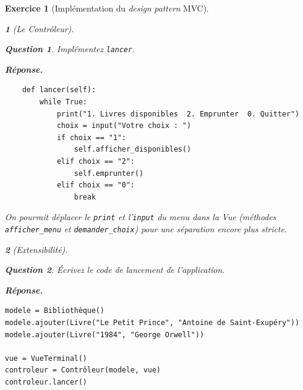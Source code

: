 \documentclass{article}
\theoremstyle{exostyle}
\newtheorem{exo}{Exercice}
\theoremstyle{partiestyle}
\newtheorem{partie}{}[exo]
\theoremstyle{questionstyle}
\newtheorem{questionpartie}{Question}[partie]
\newenvironment{reponse}{%
    \par\smallskip\noindent\textbf{Réponse.}\enspace\ignorespaces
}{%
    \par\smallskip
}
\begin{document}
\begin{exo}[Implémentation du \textit{design pattern} MVC]
\begin{partie}[Le Contrôleur]
        \begin{questionpartie}
            Implémentez \texttt{lancer}.
        \end{questionpartie}
        \begin{reponse}
\begin{lstlisting}
    def lancer(self):
        while True:
            print("1. Livres disponibles  2. Emprunter  0. Quitter")
            choix = input("Votre choix : ")
            if choix == "1":
                self.afficher_disponibles()
            elif choix == "2":
                self.emprunter()
            elif choix == "0":
                break
\end{lstlisting}
            On pourrait déplacer le \texttt{print} et l'\texttt{input} du menu dans la Vue (méthodes \texttt{afficher\_menu} et \texttt{demander\_choix}) pour une séparation encore plus stricte.
        \end{reponse}

    \end{partie}

    \begin{partie}[Extensibilité]

        \begin{questionpartie}
            Écrivez le code de lancement de l'application.
        \end{questionpartie}
        \begin{reponse}
\begin{lstlisting}
modele = Bibliothèque()
modele.ajouter(Livre("Le Petit Prince", "Antoine de Saint-Exupéry"))
modele.ajouter(Livre("1984", "George Orwell"))

vue = VueTerminal()
controleur = Contrôleur(modele, vue)
controleur.lancer()
\end{lstlisting}
        \end{reponse}


\end{partie}
\end{exo}
\end{document}
